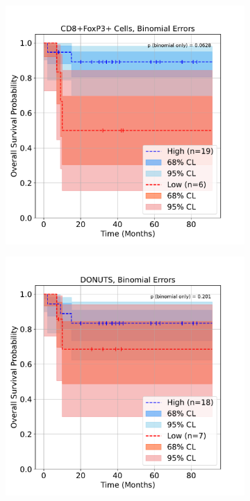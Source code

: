 \documentclass[article]{jss}
\begin{document}
\begin{figure}[p]
\begin{subfigure}[t]{0.49\textwidth}
    \caption{\label{fig:lung-dataset-donuts-patient-wise}}
  \end{subfigure} \\
  \vspace{\spacebetweenrows}
  \begin{subfigure}[t]{0.49\textwidth}
    \centering
    \includegraphics[width=\linewidth]{lung_cells_km_OS_binomial.pdf}
    \caption{\label{fig:lung-dataset-cells-binomial}}
  \end{subfigure}
  \begin{subfigure}[t]{0.49\textwidth}
    \centering
    \includegraphics[width=\linewidth]{lung_donuts_km_OS_binomial.pdf}

\end{subfigure}
\end{figure}
\end{document}
